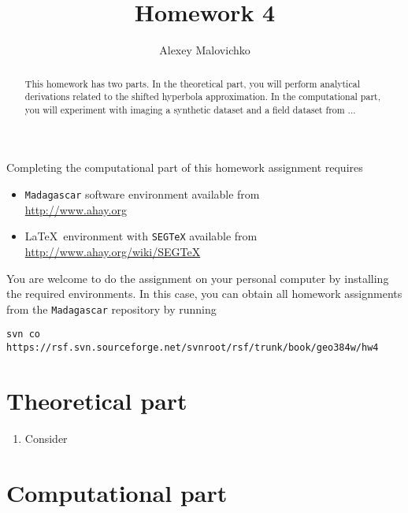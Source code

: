 \author{Alexey Malovichko} 
\title{Homework 4}

\begin{abstract}
  This homework has two parts. In the theoretical part, you will
  perform analytical derivations related to the shifted hyperbola
  approximation. In the computational part, you will experiment with
  imaging a synthetic dataset and a field dataset from ...
\end{abstract}

Completing the computational part of this homework assignment requires
\begin{itemize}
\item \texttt{Madagascar} software environment available from \\
  \url{http://www.ahay.org}
\item \LaTeX\ environment with \texttt{SEGTeX} available from \\ 
  \url{http://www.ahay.org/wiki/SEGTeX}
\end{itemize}

You are welcome to do the assignment on your personal computer by
installing the required environments. In this case, you can obtain all
homework assignments from the \texttt{Madagascar} repository by running
\begin{verbatim}
svn co https://rsf.svn.sourceforge.net/svnroot/rsf/trunk/book/geo384w/hw4 
\end{verbatim}

\section{Theoretical part}

\begin{enumerate}
\item Consider 
\end{enumerate}

\section{Computational part}

